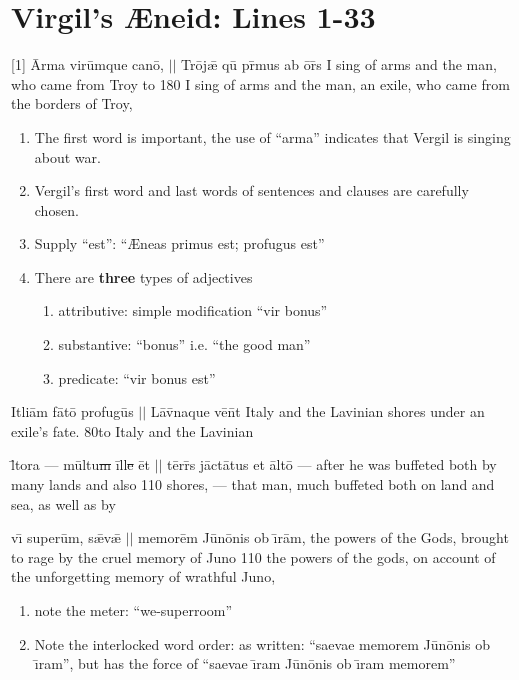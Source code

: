 \section{Virgil's {\AE}neid:  Lines 1-33} %



\latline
  {[1] \={\macron A}rm\-a v\-ir\=umqu\-e c\-an{\={\macron o}}, $||$ Tr\={o}j\={\ae} qu\={\macron{\i}} pr\={\macron{\i}}m\-us \-ab \={o}r\={\macron{\i}}s}
	{I sing of arms and the man, who came from Troy to}
  {180}
	{I sing of arms and the man, an exile, who came from the borders of Troy,}
	{
	\begin{enumerate}
			\item The first word is important, the use of ``arma'' indicates that Vergil is singing about war.
			\item Vergil's first word and last words of sentences and clauses are carefully chosen.
			\item Supply ``est'':  ``{\AE}neas primus est; profugus est''
			\item There are \textbf{three} types of adjectives
			\begin{enumerate}
				\item attributive: simple modification ``vir bonus''
				\item substantive:  ``bonus'' i.e. ``the good man''
				\item predicate:  ``vir bonus est''
			\end{enumerate}
		 \end{enumerate}	
	}

\latline
		{{\macron I}tl\-i\={a}m f\={\macron a}t\={\macron o} pr\-of\-ug\={\macron u}s $||$ L\={\macron a}v\={\macron{\i}}n\-aqu\-e v\={\macron e}n\={\macron{\i}}t}
		{Italy and the Lavinian shores under an exile's fate.}
		{80}{to Italy and the Lavinian }{}


\latline
{l\={\macron{\i}}t\-or\-a --- m\=ultu\sout{m }\={i}ll\={{\sout{e }}\=e}t $||$ t\=err\={\macron{\i}}s j\=act\={\macron a}t\-us \-et \=alt\={\macron o}}
{--- after he was buffeted both by many lands and also}
{110}
{shores, --- that man, much buffeted both on land and sea, as well as by}
{}


\latline
{v\={\i} s\-up\-er\=um, s\={\ae}v\={\ae} $||$ m\-em\-or\=em J\={u}n\={o}n\-is \-ob \={\i}r\=am,}
{the powers of the Gods, brought to rage by the cruel memory of Juno}
{110}
{the powers of the gods, on account of the unforgetting memory of wrathful Juno,}
{
	\begin{enumerate}
		\item note the meter:  ``we-superroom''
		\item Note the interlocked word order:  as written: ``saevae memorem J\={u}n\={o}nis ob {\={\i}}ram'',
		but has the force of  ``saevae {\={\i}}ram J\={u}n\={o}nis ob \={\i}ram memorem''
	\end{enumerate}
}

